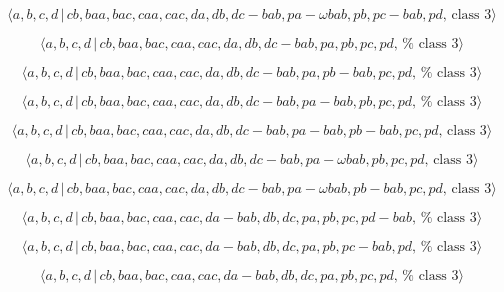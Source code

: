 \documentclass[10pt]{article}
\begin{document}
\begin{equation}
\langle a,b,c,d\,|\,cb,baa,bac,caa,cac,da,db,dc-bab,pa-\omega
bab,pb,pc-bab,pd,\,\text{class }3\rangle  \tag{7.3747}
\end{equation}

\begin{equation}
\langle a,b,c,d\,|\,cb,baa,bac,caa,cac,da,db,dc-bab,pa,pb,pc,pd,\,\text{%
class }3\rangle  \tag{7.3748}
\end{equation}

\begin{equation}
\langle a,b,c,d\,|\,cb,baa,bac,caa,cac,da,db,dc-bab,pa,pb-bab,pc,pd,\,\text{%
class }3\rangle  \tag{7.3749}
\end{equation}

\begin{equation}
\langle a,b,c,d\,|\,cb,baa,bac,caa,cac,da,db,dc-bab,pa-bab,pb,pc,pd,\,\text{%
class }3\rangle  \tag{7.3750}
\end{equation}

\begin{equation}
\langle a,b,c,d\,|\,cb,baa,bac,caa,cac,da,db,dc-bab,pa-bab,pb-bab,pc,pd,\,%
\text{class }3\rangle  \tag{7.3751}
\end{equation}

\begin{equation}
\langle a,b,c,d\,|\,cb,baa,bac,caa,cac,da,db,dc-bab,pa-\omega bab,pb,pc,pd,\,%
\text{class }3\rangle  \tag{7.3752}
\end{equation}

\begin{equation}
\langle a,b,c,d\,|\,cb,baa,bac,caa,cac,da,db,dc-bab,pa-\omega
bab,pb-bab,pc,pd,\,\text{class }3\rangle  \tag{7.3753}
\end{equation}

\begin{equation}
\langle a,b,c,d\,|\,cb,baa,bac,caa,cac,da-bab,db,dc,pa,pb,pc,pd-bab,\,\text{%
class }3\rangle  \tag{7.3754}
\end{equation}

\begin{equation}
\langle a,b,c,d\,|\,cb,baa,bac,caa,cac,da-bab,db,dc,pa,pb,pc-bab,pd,\,\text{%
class }3\rangle  \tag{7.3755}
\end{equation}

\begin{equation}
\langle a,b,c,d\,|\,cb,baa,bac,caa,cac,da-bab,db,dc,pa,pb,pc,pd,\,\text{%
class }3\rangle  \tag{7.3756}
\end{equation}
\end{document}

